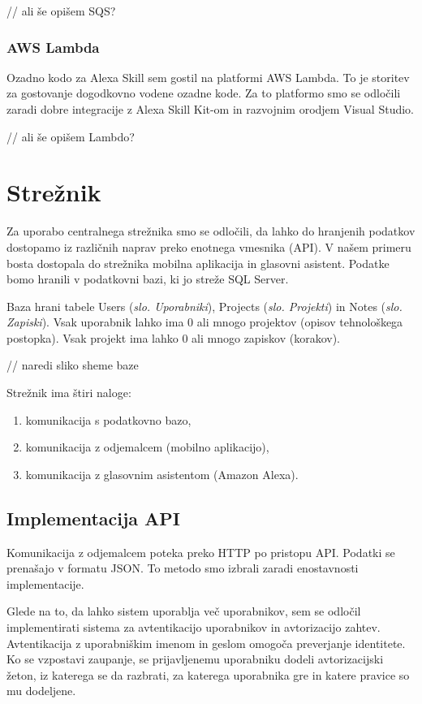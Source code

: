 \documentclass[a4paper, 12pt]{book}
\begin{document}
// ali še opišem SQS?

\subsubsection{AWS Lambda}

Ozadno kodo za Alexa Skill sem gostil na platformi AWS Lambda.
To je storitev za gostovanje dogodkovno vodene ozadne kode.
Za to platformo smo se odločili zaradi dobre integracije z Alexa Skill Kit-om in razvojnim orodjem Visual Studio.

// ali še opišem Lambdo?


\section{Strežnik}

Za uporabo centralnega strežnika smo se odločili, da lahko do hranjenih podatkov dostopamo iz različnih naprav preko enotnega vmesnika (API).
V našem primeru bosta dostopala do strežnika mobilna aplikacija in glasovni asistent.
Podatke bomo hranili v podatkovni bazi, ki jo streže SQL Server.

Baza hrani tabele Users (\textit{slo. Uporabniki}), Projects (\textit{slo. Projekti}) in Notes (\textit{slo. Zapiski}).
Vsak uporabnik lahko ima 0 ali mnogo projektov (opisov tehnološkega postopka).
Vsak projekt ima lahko 0 ali mnogo zapiskov (korakov).

// naredi sliko sheme baze

\noindent Strežnik ima štiri naloge:
\begin{enumerate}
	\item komunikacija s podatkovno bazo,
	\item komunikacija z odjemalcem (mobilno aplikacijo),
	\item komunikacija z glasovnim asistentom (Amazon Alexa).
\end{enumerate}


\subsection{Implementacija API}

Komunikacija z odjemalcem poteka preko HTTP po pristopu API.
Podatki se prenašajo v formatu JSON.
To metodo smo izbrali zaradi enostavnosti implementacije.

Glede na to, da lahko sistem uporablja več uporabnikov, sem se odločil implementirati sistema za avtentikacijo uporabnikov in avtorizacijo zahtev.
Avtentikacija z uporabniškim imenom in geslom omogoča preverjanje identitete.
Ko se vzpostavi zaupanje, se prijavljenemu uporabniku dodeli avtorizacijski žeton, iz katerega se da razbrati, za katerega uporabnika gre in katere pravice so mu dodeljene.
\end{document}
